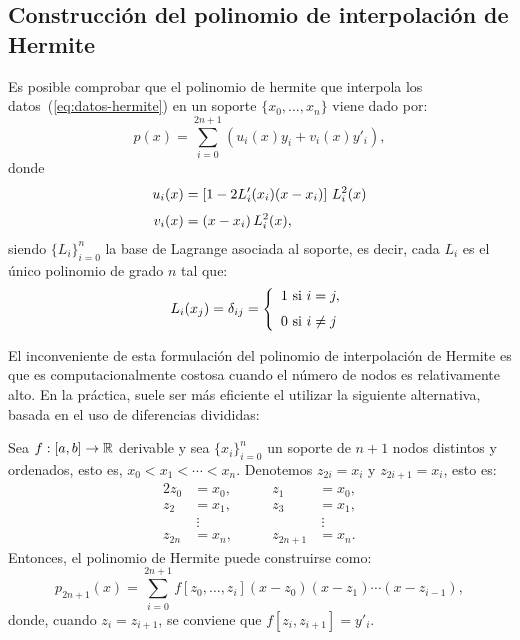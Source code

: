  \subsection*{Construcción del polinomio de interpolación de Hermite}
 \label{sec:constr-del-polin-hermite}

 Es posible comprobar que el polinomio de hermite que interpola los
 datos~(\ref{eq:datos-hermite}) en un soporte $\{x_0,\dots,x_n\}$
 viene dado por:
 \begin{equation*}
   p(x)=\sum_{i=0}^{2n+1}(u_i(x)y_i+ v_i(x)y'_i),
 \end{equation*}
 donde
 \begin{align*}
   u_i(x)&=\left[1-2L'_i(x_i)(x-x_i)\right]\, L_i^2(x)
   \\ \noalign{\smallskip}
   v_i(x)&=(x-x_i)\, L_i^2(x),
 \end{align*}
 siendo $\{L_i\}_{i=0}^n$ la base de Lagrange asociada al soporte,
 es decir, cada $L_i$ es el único polinomio de grado $n$ tal que:
 \begin{equation}
   L_i(x_j)= \delta_{ij} = 
   \left\{\begin{array}{l}
       1 \text{ si } i=j, \\\noalign{\medskip} 0 \text{ si } i\neq j
     \end{array}\right.
 \end{equation}

 El inconveniente de esta formulación del polinomio de interpolación de
 Hermite es que es computacionalmente costosa cuando el número de nodos
 es relativamente alto. En la práctica, suele ser más eficiente el
 utilizar la siguiente alternativa, basada en el uso de diferencias
 divididas:


 \begin{theorem}
   \label{thm:formula-newton-hermite}
   Sea $f:[a,b]\to\operatorname{{\mathbb R}}$ derivable y sea $\{x_i\}_{i=0}^n$ un soporte
   de $n+1$ nodos distintos y ordenados, esto es,
   $x_0<x_1<\cdots<x_n$. Denotemos $z_{2i}=x_i$ y $z_{2i+1}=x_i$, esto es:
   \begin{alignat*}{2} %
     z_0&=x_0, & z_1&=x_0,\\ 
     z_2&=x_1, & z_3&=x_1,\\ 
     &\ \vdots & &\ \vdots \\
     z_{2n}&=x_n, \qquad & z_{2n+1}&=x_n.
   \end{alignat*}
   Entonces, el polinomio de Hermite puede construirse como:
   \begin{equation*}
     p_{2n+1}(x)=\sum_{i=0}^{2n+1}f[z_0,\dots,z_i]
     (x-z_0)(x-z_1)\cdots(x-z_{i-1}), 
   \end{equation*}
   donde, cuando $z_i=z_{i+1}$, se conviene que $f[z_i,z_{i+1}]=y'_i$.
 \end{theorem}

